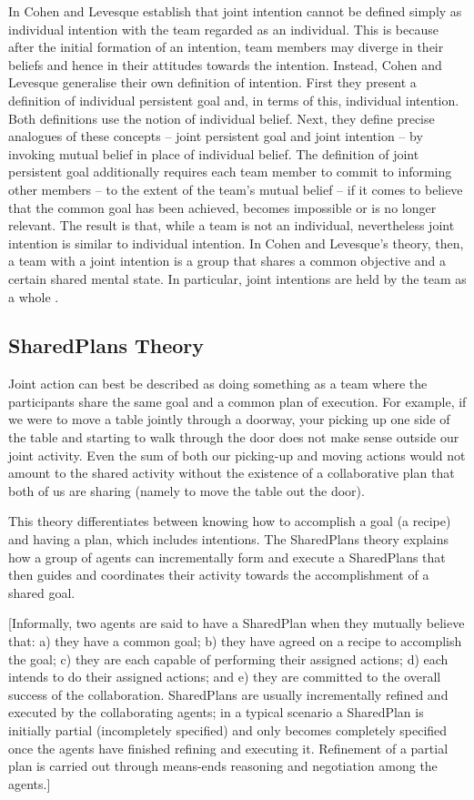 \documentclass[11pt]{article}
\begin{document}
In \cite{cohen:teamwork} Cohen and Levesque establish that joint intention
cannot be defined simply as individual intention with the team regarded as an
individual. This is because after the initial formation of an intention, team
members may diverge in their beliefs and hence in their attitudes towards the
intention. Instead, Cohen and Levesque generalise their own definition of
intention. First they present a definition of individual persistent goal and, in
terms of this, individual intention. Both definitions use the notion of
individual belief. Next, they define precise analogues of these concepts --
joint persistent goal and joint intention -- by invoking mutual belief in place
of individual belief. The definition of joint persistent goal additionally
requires each team member to commit to informing other members -- to the extent
of the team's mutual belief -- if it comes to believe that the common goal has
been achieved, becomes impossible or is no longer relevant. The result is that,
while a team is not an individual, nevertheless joint intention is similar to
individual intention. In Cohen and Levesque's theory, then, a team with a joint
intention is a group that shares a common objective and a certain shared mental
state. In particular, joint intentions are held by the team as a whole
\cite{jarvis:teams-multiagent-systems}.

\subsection{SharedPlans Theory}
\label{sec:sharedplans}

Joint action can best be described as doing something as a team where the
participants share the same goal and a common plan of execution. For example, if
we were to move a table jointly through a doorway, your picking up one side of
the table and starting to walk through the door does not make sense outside our
joint activity. Even the sum of both our picking-up and moving actions would not
amount to the shared activity without the existence of a collaborative plan that
both of us are sharing (namely to move the table out the door).

This theory differentiates between knowing how to accomplish a goal (a recipe)
and having a plan, which includes intentions. The SharedPlans theory explains
how a group of agents can incrementally form and execute a SharedPlans that then
guides and coordinates their activity towards the accomplishment of a shared
goal.

[Informally, two agents are said to have a SharedPlan when  they mutually
believe that: a) they have a common goal; b) they have agreed on a recipe to accomplish
the goal; c) they are each capable of performing their assigned actions; d) each
intends to do their assigned actions; and e) they are committed to the overall
success of the collaboration. SharedPlans are usually incrementally refined and
executed by the collaborating agents; in a typical scenario a SharedPlan is
initially partial (incompletely specified) and only becomes completely specified
once the agents have finished refining and executing it. Refinement of a partial
plan is carried out through means-ends reasoning and negotiation among the
agents.]
\end{document}
